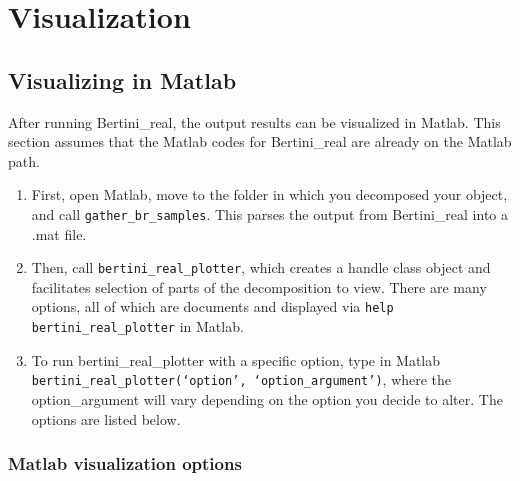 
\section{Visualization}
\label{sec:visualization}






\subsection{Visualizing in Matlab}
After running Bertini\_real, the output results can be visualized in Matlab.  This section assumes that the Matlab codes for Bertini\_real are already on the Matlab path.

\begin{enumerate}
\item First, open Matlab, move to the folder in which you decomposed your object, and call \texttt{gather\_br\_samples}. This parses the output from Bertini\_real into a .mat file.
\item Then, call \texttt{bertini\_real\_plotter\-}, which creates a handle class object and facilitates selection of parts of the decomposition to view. There are many options, all of which are documents and displayed via \texttt{help bertini\_real\_plotter\-} in Matlab.
\item To run bertini\_real\_plotter with a specific option, type in Matlab\\
	\texttt{bertini\_real\_plotter\-(`option', `option\_argument')}, where the option\_argument will vary depending on the option you decide to alter. The options are listed below.
\end{enumerate}


\subsubsection{Matlab visualization options}
\noindent

